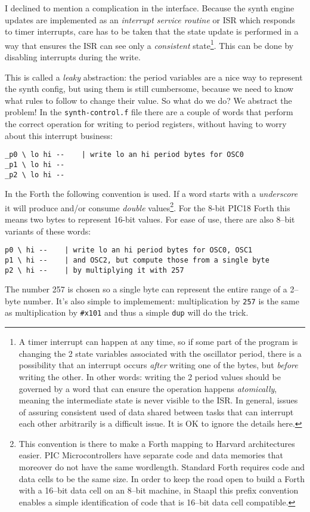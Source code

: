 \documentclass[12pt]{article}
\begin{document}
I declined to mention a complication in the interface. Because the
synth engine updates are implemented as an \emph{interrupt service
  routine} or ISR which responds to timer interrupts, care has to be
taken that the state update is performed in a way that ensures the ISR
can see only a \emph{consistent} state\footnote{A timer interrupt can
  happen at any time, so if some part of the program is changing the 2
  state variables associated with the oscillator period, there is a
  possibility that an interrupt occurs \emph{after} writing one of the
  bytes, but \emph{before} writing the other. In other words: writing
  the 2 period values should be governed by a word that can ensure the
  operation happens \emph{atomically}, meaning the intermediate state
  is never visible to the ISR. In general, issues of assuring
  consistent used of data shared between tasks that can interrupt each
  other arbitrarily is a difficult issue. It is OK to ignore the
  details here.}. This can be done by disabling interrupts during the
write.

This is called a \emph{leaky} abstraction: the period variables are a
nice way to represent the synth config, but using them is still
cumbersome, because we need to know what rules to follow to change
their value. So what do we do? We abstract the problem! In the
\verb|synth-control.f| file there are a couple of words that perform
the correct operation for writing to period registers, without having
to worry about this interrupt business:
\begin{verbatim}
_p0 \ lo hi --    | write lo an hi period bytes for OSC0
_p1 \ lo hi --
_p2 \ lo hi --
\end{verbatim}
In the Forth the following convention is used. If a word starts with a
\emph{underscore} it will produce and/or consume \emph{double}
values\footnote{This convention is there to make a Forth mapping to
  Harvard architectures easier. PIC Microcontrollers have separate
  code and data memories that moreover do not have the same
  wordlength. Standard Forth requires code and data cells to be the
  same size. In order to keep the road open to build a Forth with a
  16--bit data cell on an 8--bit machine, in Staapl this prefix
  convention enables a simple identification of code that is 16--bit
  data cell compatible.}. For the 8-bit PIC18 Forth this means two bytes to
represent 16-bit values. For ease of use, there are also 8--bit
variants of these words:
\begin{verbatim}
p0 \ hi --    | write lo an hi period bytes for OSC0, OSC1
p1 \ hi --    | and OSC2, but compute those from a single byte
p2 \ hi --    | by multiplying it with 257
\end{verbatim}
The number 257 is chosen so a single byte can represent the entire
range of a 2--byte number. It's also simple to implemement:
multiplication by \verb|257| is the same as multiplication by
\verb|#x101| and thus a simple \verb|dup| will do the trick.
\end{document}
